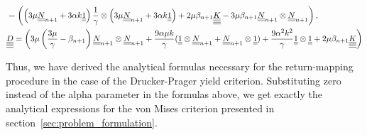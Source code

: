 \documentclass[12pt]{article}
\begin{document}
\begin{appendices}
\begin{align*}
        & = \left( \left( 3\mu \underline{\underline{N}}_{n+1} + 3\alpha k \underline{\underline{1}} \right) \frac{1}{\gamma} \otimes \left( 3\mu \underline{\underline{N}}_{n+1} + 3\alpha k \underline{\underline{1}} \right) + 2\mu\beta_{n+1}\underline{\underline{\underline{\underline{K}}}} - 3\mu\beta_{n+1}\underline{\underline{N}}_{n+1} \otimes \underline{\underline{N}}_{n+1} \right), \\
        & \underline{\underline{\underline{\underline{D}}}} = \left( 3\mu\left(\frac{3\mu}{\gamma} - \beta_{n+1}\right)\underline{\underline{N}}_{n+1} \otimes \underline{\underline{N}}_{n+1} + \frac{9\alpha\mu k}{\gamma} (\underline{\underline{1}} \otimes \underline{\underline{N}}_{n+1} + \underline{\underline{N}}_{n+1} \otimes \underline{\underline{1}}) + \frac{9\alpha^2k^2}{\gamma} \underline{\underline{1}} \otimes \underline{\underline{1}} + 2\mu\beta_{n+1} \underline{\underline{\underline{\underline{K}}}} \right)
    \end{align*}

    Thus, we have derived the analytical formulas necessary for the return-mapping procedure in the case of the Drucker-Prager yield criterion. Substituting zero instead of the alpha parameter in the formulas above, we get exactly the analytical expressions for the von Mises criterion presented in section~\ref{sec:problem_formulation}.
\end{appendices}
\end{document}
